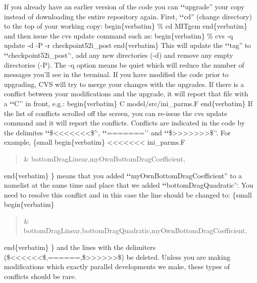 \documentclass[letterpaper,10pt,english]{sphinxmanual}
\begin{document}
If you already have an earlier version of the code you can {\color{red}\bfseries{}{}`{}`}upgrade''
your copy instead of downloading the entire repository again. First,
{\color{red}\bfseries{}{}`{}`}cd'' (change directory) to the top of your working copy:
begin\{verbatim\}
\% cd MITgcm
end\{verbatim\}
and then issue the cvs update command such as:
begin\{verbatim\}
\% cvs -q update -d -P -r checkpoint52i\_post
end\{verbatim\}
This will update the {\color{red}\bfseries{}{}`{}`}tag'' to {\color{red}\bfseries{}{}`{}`}checkpoint52i\_post'`, add any new
directories (-d) and remove any empty directories (-P). The -q option
means be quiet which will reduce the number of messages you'll see in
the terminal. If you have modified the code prior to upgrading, CVS
will try to merge your changes with the upgrades. If there is a
conflict between your modifications and the upgrade, it will report
that file with a {\color{red}\bfseries{}{}`{}`}C'' in front, e.g.:
begin\{verbatim\}
C model/src/ini\_parms.F
end\{verbatim\}
If the list of conflicts scrolled off the screen, you can re-issue the
cvs update command and it will report the conflicts. Conflicts are
indicated in the code by the delimites {\color{red}\bfseries{}{}`{}`}\$\textless{}\textless{}\textless{}\textless{}\textless{}\textless{}\textless{}\$'`, {\color{red}\bfseries{}{}`{}`}======='' and
{\color{red}\bfseries{}{}`{}`}\$\textgreater{}\textgreater{}\textgreater{}\textgreater{}\textgreater{}\textgreater{}\textgreater{}\$'`. For example,
\{small
begin\{verbatim\}
\textless{}\textless{}\textless{}\textless{}\textless{}\textless{}\textless{} ini\_parms.F
\begin{quote}

\& bottomDragLinear,myOwnBottomDragCoefficient,
\end{quote}

end\{verbatim\}
\}
means that you added {\color{red}\bfseries{}{}`{}`}myOwnBottomDragCoefficient'' to a namelist at
the same time and place that we added {\color{red}\bfseries{}{}`{}`}bottomDragQuadratic'`. You
need to resolve this conflict and in this case the line should be
changed to:
\{small
begin\{verbatim\}
\begin{quote}

\& bottomDragLinear,bottomDragQuadratic,myOwnBottomDragCoefficient,
\end{quote}

end\{verbatim\}
\}
and the lines with the delimiters (\$\textless{}\textless{}\textless{}\textless{}\textless{}\textless{}\$,======,\$\textgreater{}\textgreater{}\textgreater{}\textgreater{}\textgreater{}\textgreater{}\$) be deleted.
Unless you are making modifications which exactly parallel
developments we make, these types of conflicts should be rare.
\end{document}
